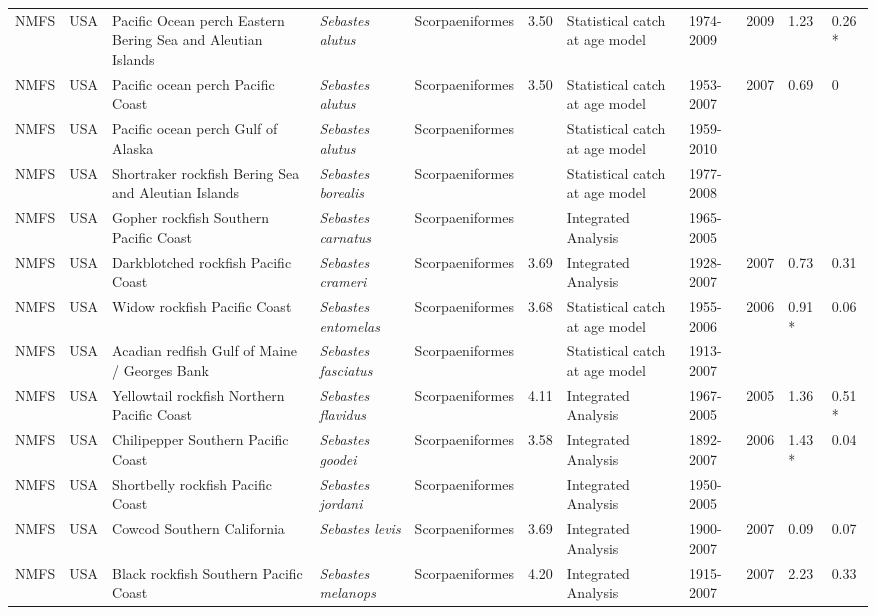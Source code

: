 \begin{longtable}{p{1.5cm}p{1.5cm}p{3cm}p{3cm}p{2.5cm}p{0.9cm}p{1.4cm}p{0.9cm}p{0.9cm}p{0.9cm}p{1cm}}
  NMFS & USA & Pacific Ocean perch Eastern Bering Sea and Aleutian Islands & \textit{Sebastes alutus} & Scorpaeniformes & 3.50 & Statistical catch at age model & 1974-2009 & 2009 & 1.23 & 0.26 * \\ 
  NMFS & USA & Pacific ocean perch Pacific Coast & \textit{Sebastes alutus} & Scorpaeniformes & 3.50 & Statistical catch at age model & 1953-2007 & 2007 & 0.69 & 0 \\ 
  NMFS & USA & Pacific ocean perch Gulf of Alaska & \textit{Sebastes alutus} & Scorpaeniformes &  & Statistical catch at age model & 1959-2010 &  &  &  \\ 
  NMFS & USA & Shortraker rockfish Bering Sea and Aleutian Islands & \textit{Sebastes borealis} & Scorpaeniformes &  & Statistical catch at age model & 1977-2008 &  &  &  \\ 
  NMFS & USA & Gopher rockfish Southern Pacific Coast & \textit{Sebastes carnatus} & Scorpaeniformes &  & Integrated Analysis & 1965-2005 &  &  &  \\ 
  NMFS & USA & Darkblotched rockfish Pacific Coast & \textit{Sebastes crameri} & Scorpaeniformes & 3.69 & Integrated Analysis & 1928-2007 & 2007 & 0.73 & 0.31 \\ 
  NMFS & USA & Widow rockfish Pacific Coast & \textit{Sebastes entomelas} & Scorpaeniformes & 3.68 & Statistical catch at age model & 1955-2006 & 2006 & 0.91 * & 0.06 \\ 
  NMFS & USA & Acadian redfish Gulf of Maine / Georges Bank & \textit{Sebastes fasciatus} & Scorpaeniformes &  & Statistical catch at age model & 1913-2007 &  &  &  \\ 
  NMFS & USA & Yellowtail rockfish Northern Pacific Coast & \textit{Sebastes flavidus} & Scorpaeniformes & 4.11 & Integrated Analysis & 1967-2005 & 2005 & 1.36 & 0.51 * \\ 
  NMFS & USA & Chilipepper Southern Pacific Coast & \textit{Sebastes goodei} & Scorpaeniformes & 3.58 & Integrated Analysis & 1892-2007 & 2006 & 1.43 * & 0.04 \\ 
  NMFS & USA & Shortbelly rockfish Pacific Coast & \textit{Sebastes jordani} & Scorpaeniformes &  & Integrated Analysis & 1950-2005 &  &  &  \\ 
  NMFS & USA & Cowcod Southern California & \textit{Sebastes levis} & Scorpaeniformes & 3.69 & Integrated Analysis & 1900-2007 & 2007 & 0.09 & 0.07 \\ 
  NMFS & USA & Black rockfish Southern Pacific Coast & \textit{Sebastes melanops} & Scorpaeniformes & 4.20 & Integrated Analysis & 1915-2007 & 2007 & 2.23 & 0.33 \\ 

\end{longtable}
